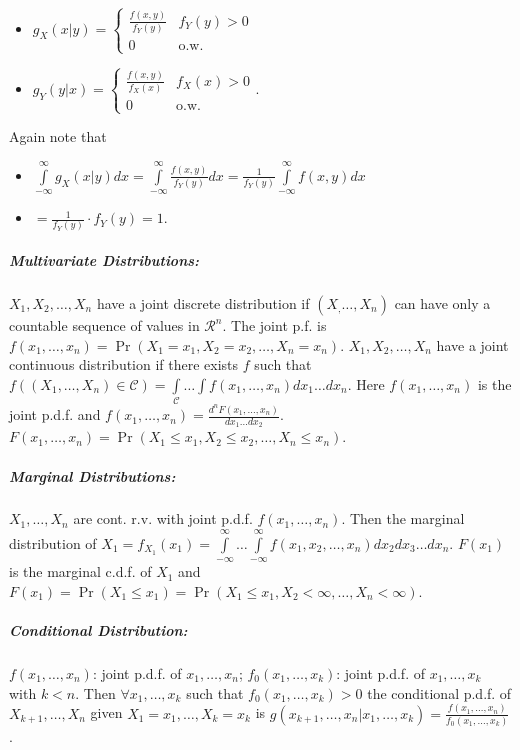 \documentclass[landscape,10pt]{article}
\begin{document}
\begin{multicols}{4}
\begin{itemize}
\item[] \(g_X(x|y) = \begin{cases} \frac{f(x,y)}{f_Y(y)} & f_Y(y) > 0 \\ 0 & \text{o.w.} \end{cases} \)
\item[] \(g_Y(y|x) = \begin{cases} \frac{f(x,y)}{f_X(x)} & f_X(x) > 0 \\ 0 & \text{o.w.} \end{cases}\).
\end{itemize}
 Again note that 
 \begin{itemize}
    \item[] \(\int\limits_{-\infty}^{\infty}g_X(x|y)dx = \int\limits_{-\infty}^{\infty} \frac{f(x,y)}{f_Y(y)}dx = \frac{1}{f_Y(y)} \int\limits_{-\infty}^{\infty}f(x,y)dx \)
    \item[] \(= \frac{1}{f_Y(y)} \cdot f_Y(y) = 1\).
 \end{itemize}

\subparagraph*{Multivariate Distributions:}
 \(X_1, X_2, \ldots, X_n\) have a joint discrete distribution if \((X_, \dots, X_n)\) can have only a countable sequence of values in \(\mathcal{R}^n\). The joint p.f. is \(f(x_1,\dots,x_n) = \Pr(X_1=x_1, X_2=x_2,\ldots,X_n=x_n)\). \(X_1, X_2, \ldots, X_n\) have a joint continuous distribution if there exists \(f\) such that \(f\left((X_1,\ldots,X_n)\in \mathcal{C}\right) = \int\limits_{\mathcal{C}}\dots\int f(x_1,\ldots,x_n)dx_1\ldots dx_n\). Here \(f(x_1,\ldots,x_n)\) is the joint p.d.f. and \(f(x_1,\ldots,x_n) = \frac{d^nF(x_1,\ldots,x_n)}{dx_1\ldots dx_2}\). \(F(x_1,\ldots,x_n) = \Pr(X_1 \leq x_1, X_2 \leq x_2, \ldots, X_n \leq x_n)\).

 \subparagraph*{Marginal Distributions: }
    \(X_1, \ldots, X_n\) are cont. r.v. with joint p.d.f. \(f(x_1, \ldots, x_n)\). Then the marginal distribution of \(X_1 = f_{X_1}(x_1) = \int\limits_{- \infty}^{\infty} \dots \int\limits_{- \infty}^{\infty} f(x_1,x_2, \ldots, x_n)dx_2dx_3\ldots dx_n\). \(F(x_1)\) is the marginal c.d.f. of \(X_1\) and \(F(x_1) = \Pr(X_1 \leq x_1) = \Pr(X_1 \leq x_1, X_2 < \infty, \ldots, X_n < \infty)\).

\subparagraph*{Conditional Distribution: }
 \(f(x_1, \ldots, x_n)\): joint p.d.f. of \(x_1, \ldots, x_n\); \(f_0(x_1, \ldots, x_k)\): joint p.d.f. of \(x_1, \ldots, x_k\) with \(k < n\). Then \(\forall x_1,\ldots, x_k\) such that \(f_0(x_1, \ldots, x_k) > 0\) the conditional p.d.f. of \(X_{k+1},\ldots,X_n\) given \(X_1 = x_1, \ldots, X_k = x_k\) is \(g(x_{k+1},\ldots,x_n | x_1, \ldots, x_k) = \frac{f(x_1, \ldots, x_n)}{f_0(x_1, \ldots, x_k)}\).


\end{multicols}
\end{document}
